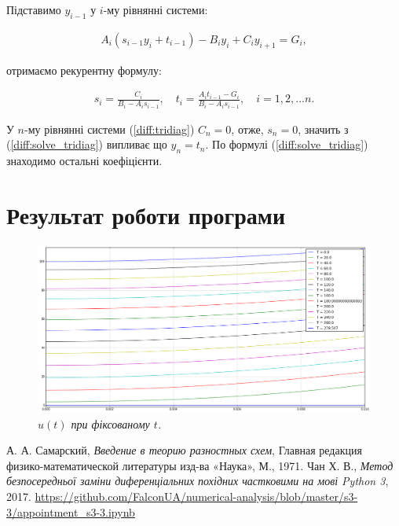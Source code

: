 Підставимо \( y_{i-1} \) у \(i\)-му рівнянні системи:

\begin{equation}
\begin{multlined} 
A_i\left(s_{i-1}y_i + t_{i-1}\right) - B_i y_i + C_iy_{i+1} = G_i,
\end{multlined}
\end{equation}

отримаємо рекурентну формулу:

\begin{equation}
\begin{multlined} 
s_i = \frac{C_i}{B_i-A_is_{i-1}}, \quad t_i = \frac{A_it_{i-1}-G_i}{B_i-A_is_{i-1}}, \quad i = 1, 2, \dots n.
\end{multlined}
\end{equation}

У \(n\)-му рівнянні системи (\ref{diff:tridiag}) \(C_n = 0\), отже, \(s_n = 0\), значить з (\ref{diff:solve_tridiag}) випливає що \(y_n = t_n\). По формулі (\ref{diff:solve_tridiag}) знаходимо остальні коефіцієнти.

\newpage

\section{Результат роботи програми}
\begin{figure}[h!]
  \centering
  \includegraphics[width=.9\linewidth]{res0}
  \caption{\it \( u(t)\) при фіксованому \(t\).}

\end{figure}

\begin{thebibliography}{9}

  А. А. Самарский,
  \emph{Введение в теорию разностных схем},
  Главная редакция физико-математической литературы изд-ва «Наука», 
  М., 1971. 
  Чан Х. В., \emph{Метод безпосередньої заміни диференціальних похідних частковими на мові Python 3}, 2017. 
  \url{https://github.com/FalconUA/numerical-analysis/blob/master/s3-3/appointment_s3-3.ipynb}

\end{thebibliography}
